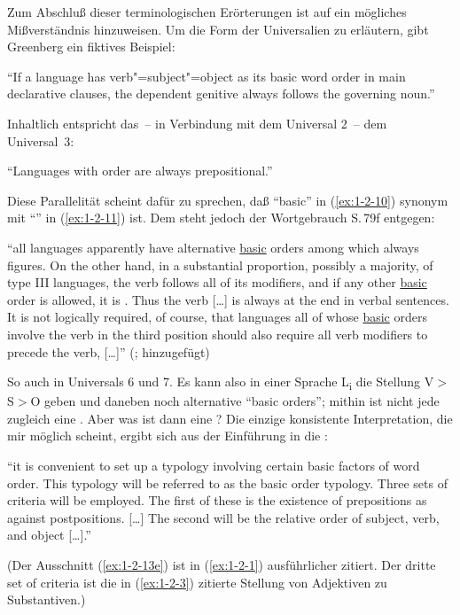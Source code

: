 \documentclass[output=paper]{langsci/langscibook}
\begin{document}
Zum Abschluß dieser terminologischen Erörterungen ist auf ein
mögliches Mißverständnis hinzuweisen. Um die Form der Universalien zu
erläutern, gibt Greenberg ein fiktives Beispiel:
\begin{exe}
\ex\label{ex:1-2-10}
"`If a language has verb"=subject"=object as its basic word order in main declarative clauses, the dependent genitive always follows the governing noun."'
\citep[74]{Greenberg1963}
\end{exe}
Inhaltlich entspricht das~-- in Verbindung mit dem Universal 2~– dem Universal~3:
\begin{exe}
\ex\label{ex:1-2-11}
"`Languages with   order are always prepositional."' \citep[78]{Greenberg1963}
\end{exe}
Diese Parallelität scheint dafür zu sprechen, daß "`basic"' in (\ref{ex:1-2-10}) synonym mit "`"' in (\ref{ex:1-2-11}) ist. Dem steht jedoch der Wortgebrauch S.\,79f entgegen:
\begin{exe}
\ex\label{ex:1-2-12}
"`all  languages apparently have alternative \underline{basic} orders among which
 always figures. On the other hand, in a substantial proportion, possibly
a majority, of type III languages, the verb follows all of its modifiers, and if
any other \underline{basic} order is allowed, it is . Thus the verb [\ldots] is always at
the end in verbal sentences. It is not logically required, of course, that languages all of whose \underline{basic} orders involve the verb in the third position should
also require all verb modifiers to precede the verb, [\ldots]"'
(\citealt[79]{Greenberg1963};  hinzugefügt)
\end{exe}
So auch in Universals 6 und 7. Es kann also in einer Sprache L\textsubscript{i} \zb die 
Stellung V$>$S$>$O geben und daneben noch alternative "`basic orders"'; mithin ist nicht
jede  zugleich eine . Aber was ist dann eine ? Die einzige konsistente Interpretation, die mir möglich scheint, ergibt sich aus
der Einführung in die :
\begin{exe}
\ex\label{ex:1-2-13}
\begin{xlist}
\ex\label{ex:1-2-13a}
 "`it is convenient to set up a typology involving certain basic factors of word
order.
\ex\label{ex:1-2-13b} This typology will be referred to as the basic order typology.
\ex\label{ex:1-2-13c} Three sets of criteria will be employed.
\ex\label{ex:1-2-13d} The first of these is the existence of prepositions as against postpositions.
[\ldots]
\ex\label{ex:1-2-13e} The second will be the relative order of subject, verb, and object [\ldots]."' \citep[76]{Greenberg1963}
\end{xlist}
\end{exe}
(Der Ausschnitt (\ref{ex:1-2-13e}) ist in (\ref{ex:1-2-1})
ausführlicher zitiert. Der dritte set of criteria ist die in
(\ref{ex:1-2-3}) zitierte Stellung von Adjektiven zu Substantiven.)
\end{document}
